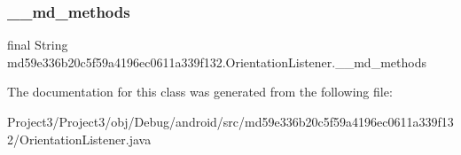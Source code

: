\subsubsection{\texorpdfstring{\+\_\+\+\_\+md\+\_\+methods}{\_\_md\_methods}}
{\footnotesize\ttfamily final String md59e336b20c5f59a4196ec0611a339f132.\+Orientation\+Listener.\+\_\+\+\_\+md\+\_\+methods\hspace{0.3cm}{\ttfamily [static]}}



The documentation for this class was generated from the following file\+:\begin{DoxyCompactItemize}
\item 
Project3/\+Project3/obj/\+Debug/android/src/md59e336b20c5f59a4196ec0611a339f132/Orientation\+Listener.\+java\end{DoxyCompactItemize}
